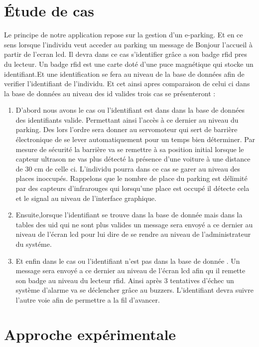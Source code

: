 \documentclass[12pt, openany]{report}
\begin{document}
        \newpage
         \thispagestyle{empty}
     \chapter{Étude de cas}
     \large

Le principe de notre application repose sur la gestion d'un e-parking. Et en ce sens  lorsque l'individu veut acceder au parking un message de Bonjour l'accueil à partir de l'ecran lcd. Il devra dans ce cas s'identifier grâce a son badge rfid pres du lecteur. Un badge rfid est une carte doté d'une puce magnétique qui stocke un identifiant.Et une identification se fera au niveau de la base de données afin de verifier l'identifiant de l'individu. Et cet ainsi apres comparaison de celui ci  dans la base de données au niveau des id valides  trois cas se présenteront :
\begin{enumerate}
\item D'abord nous avons le cas ou l'identifiant est dans dans la  base de données des identifiants valide. Permettant ainsi l'accès à ce dernier au niveau du parking. Des lors l'ordre sera donner au servomoteur qui sert de barrière électronique de se lever automatiquement pour un temps bien déterminer. Par mesure de sécurité la barrière va se remettre à sa position initial lorsque le capteur ultrason ne vas plus détecté la présence d'une voiture à une distance de 30 cm de celle ci. L'individu pourra dans ce cas se garer au niveau des places inoccupés. Rappelons que le nombre de place du parking est délimité par des capteurs d'infrarouges qui lorsqu'une place est occupé il  détecte cela et le signal au niveau de l'interface graphique. 
\item Ensuite,lorsque l'identifiant se trouve dans la base de donnée mais dans la tables des uid qui ne sont plus valides un message sera envoyé a ce dernier au niveau de l'écran lcd pour lui dire de se rendre au niveau de l'administrateur du systéme.
\item  Et enfin dans le cas ou l'identifiant n'est pas dans la base de donnée . Un message sera envoyé a ce dernier au niveau de l'écran lcd afin qu il remette son badge au niveau du lecteur rfid. Ainsi  après 3 tentatives d'échec un système d'alarme va se déclencher grâce au buzzers. L'identifiant devra suivre l'autre voie afin de permettre a la fil d'avancer. 
\end{enumerate}
       


 \chapter{Approche expérimentale}
\end{document}
